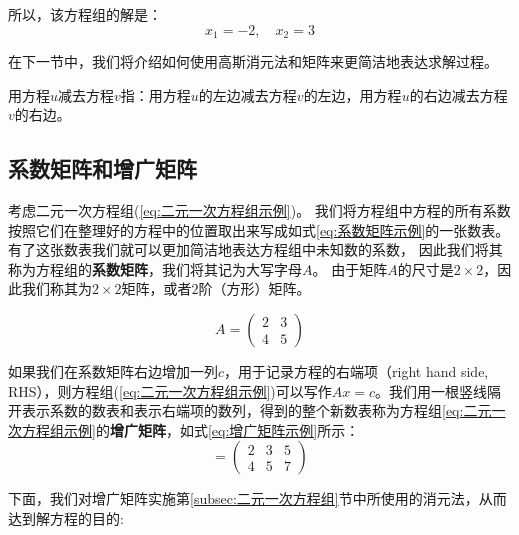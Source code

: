所以，该方程组的解是：
\[
x_1 = -2, \quad x_2 = 3
\]


在下一节中，我们将介绍如何使用高斯消元法和矩阵来更简洁地表达求解过程。

\vspace{0.5cm}

\begin{note}
    用方程$u$减去方程$v$指：用方程$u$的左边减去方程$v$的左边，用方程$u$的右边减去方程$v$的右边。
\end{note}

\subsection{系数矩阵和增广矩阵}
\label{subsec:系数矩阵和增广矩阵}

考虑二元一次方程组(\ref{eq:二元一次方程组示例})。
我们将方程组中方程的所有系数按照它们在整理好的方程中的位置取出来写成如式\ref{eq:系数矩阵示例}的一张数表。
有了这张数表我们就可以更加简洁地表达方程组中未知数的系数，
因此我们将其称为方程组的\textcolor{third}{\bf 系数矩阵}，我们将其记为大写字母$A$。
由于矩阵$A$的尺寸是$2\times 2$，因此我们称其为$2\times 2$矩阵，或者$2$阶（方形）矩阵。

\begin{equation}
  A = \left(\begin{array}{ll}
2 & 3 \\
4 & 5
\end{array}\right)
\label{eq:系数矩阵示例}
\end{equation}

如果我们在系数矩阵右边增加一列$c$，用于记录方程的右端项（right hand side, RHS），则方程组(\ref{eq:二元一次方程组示例})可以写作$Ax=c$。我们用一根竖线隔开表示系数的数表和表示右端项的数列，得到的整个新数表称为方程组\ref{eq:二元一次方程组示例}的\textcolor{third}{\bf 增广矩阵}，如式\ref{eq:增广矩阵示例}所示：
\begin{equation}
    [A \mid c]=\left(\begin{array}{cc|c}
2 & 3 & 5 \\
4 & 5 & 7
\end{array}\right)
\label{eq:增广矩阵示例}
\end{equation}

下面，我们对增广矩阵实施第\ref{subsec:二元一次方程组}节中所使用的消元法，从而达到解方程的目的:

